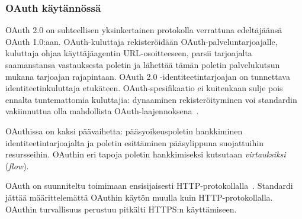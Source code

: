 \documentclass[finnish,gradu]{tktltiki}
\begin{document}


  \subsubsection{OAuth käytännössä} %
  \label{ssub:oauth_käytännössä}

  OAuth 2.0 on suhteellisen yksinkertainen protokolla verrattuna edeltäjäänsä OAuth 1.0:aan. OAuth-kuluttaja rekisteröidään OAuth-palveluntarjoajalle, kuluttaja ohjaa käyttäjäagentin URL-osoitteeseen, parsii tarjoajalta saamanstansa vastauksesta poletin ja lähettää tämän poletin palvelukutsun mukana tarjoajan rajapintaan. OAuth 2.0 -identiteetintarjoajan on tunnettava identiteetinkuluttaja etukäteen. OAuth-spesifikaatio ei kuitenkaan sulje pois ennalta tuntemattomia kuluttajia: dynaaminen rekisteröityminen voi standardin vakiinnuttua olla mahdollista OAuth-laajennoksena~\cite{ietf_oauth2_unregistered_clients}.

  OAuthissa on kaksi päävaihetta: pääsyoikeuspoletin hankkiminen identiteetintarjoajalta ja poletin esittäminen pääsylippuna suojattuihin resursseihin. OAuthin eri tapoja poletin hankkimiseksi kutsutaan \emph{virtauksiksi} (\emph{flow}).
  \cite{hueniverse_oauth_intro}

  OAuth on suunniteltu toimimaan ensisijaisesti HTTP-protokollalla~\cite{ietf_oauth2}.
  Standardi jättää määrittelemättä OAuthin käytön muulla kuin HTTP-protokollalla.
  OAuthin turvallisuus perustuu pitkälti HTTPS:n käyttämiseen.

\end{document}
